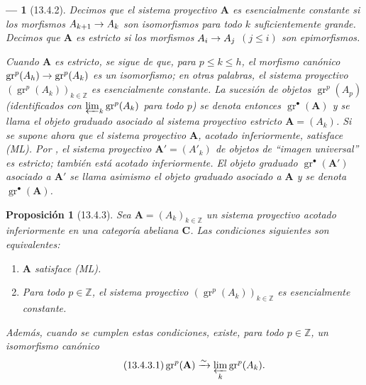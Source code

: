 \documentclass[10pt,oneside,openany]{book}
\theoremstyle{egaenv}\newtheorem*{env}{---}
\theoremstyle{egastatement}
\newtheorem*{proposition}{Proposición}
\theoremstyle{egadescription}
\renewcommand{\leq}{\leqslant}
\renewcommand{\to}{\mathchoice{\longrightarrow}{\rightarrow}{\rightarrow}{\rightarrow}}
\begin{document}
\begin{env}[13.4.2]
\label{0.13.4.2}
\label{0.13.4.2-fr}
Decimos que el sistema proyectivo $\mathbf A$ es
\emph{esencialmente constante} si los morfismos
$A_{k+1}\to A_k$ son isomorfismos para todo $k$
suficientemente grande.
Decimos que $\mathbf A$ es \emph{estricto} si los morfismos
$A_i\to A_j$ $(j\leq i)$ son epimorfismos.

Cuando $\mathbf A$ es estricto, se sigue de  que, para
$p\leq k\leq h$, el morfismo canónico
$\operatorname{gr}^p(A_h)\to\operatorname{gr}^p(A_k)$
es un isomorfismo; en otras palabras, el sistema proyectivo
$(\operatorname{gr}^p(A_k))_{k\in\mathbb Z}$ es esencialmente constante.
La sucesión de objetos $\operatorname{gr}^p(A_p)$ (identificados con $\varprojlim_k\operatorname{gr}^p(A_k)$ para todo $p$) se denota entonces
$\operatorname{gr}^\bullet(\mathbf A)$ y se llama el
\emph{objeto graduado asociado al sistema proyectivo estricto}
$\mathbf A=(A_k)$. Si se supone ahora que el sistema proyectivo $\mathbf A$, acotado
inferiormente, satisface (ML).
Por , el sistema proyectivo
$\mathbf A'=(A'_k)$ de objetos de ``imagen universal'' es estricto; también está
acotado inferiormente.
El objeto graduado $\operatorname{gr}^\bullet(\mathbf A')$ asociado a
$\mathbf A'$ se llama asimismo el objeto graduado
\emph{asociado a} $\mathbf A$ y se denota
$\operatorname{gr}^\bullet(\mathbf A)$.
\end{env}

\begin{proposition}[13.4.3]
\label{0.13.4.3}
\label{0.13.4.3-fr}
Sea $\mathbf A=(A_k)_{k\in\mathbb Z}$ un sistema proyectivo acotado
inferiormente en una categoría abeliana $\boldsymbol{C}$.
Las condiciones siguientes son equivalentes:
\begin{enumerate}
  \item[{\rm a)}] $\mathbf A$ satisface \textup{(ML)}.
  \item[{\rm b)}] Para todo $p\in\mathbb Z$, el sistema proyectivo
  $(\operatorname{gr}^p(A_k))_{k\in\mathbb Z}$ es esencialmente constante.
\end{enumerate}
Además, cuando se cumplen estas condiciones, existe, para todo
$p\in\mathbb Z$, un isomorfismo canónico
\begin{equation}
\label{0.13.4.3.1-fr}
\tag{13.4.3.1}
\operatorname{gr}^p(\mathbf A)\xrightarrow{\sim}
\varprojlim_k\operatorname{gr}^p(A_k).
\end{equation}
\end{proposition}
\end{document}
